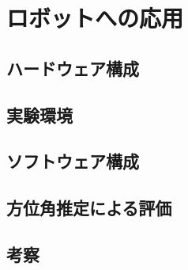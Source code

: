 \section{ロボットへの応用}
\label{chap:exp_robot}

\subsection{ハードウェア構成}
\label{hard}

\subsection{実験環境}
\label{robot_exp}

\subsection{ソフトウェア構成}
\label{soft}

\subsection{方位角推定による評価}
\label{result_robot}

\subsection{考察}
\newpage